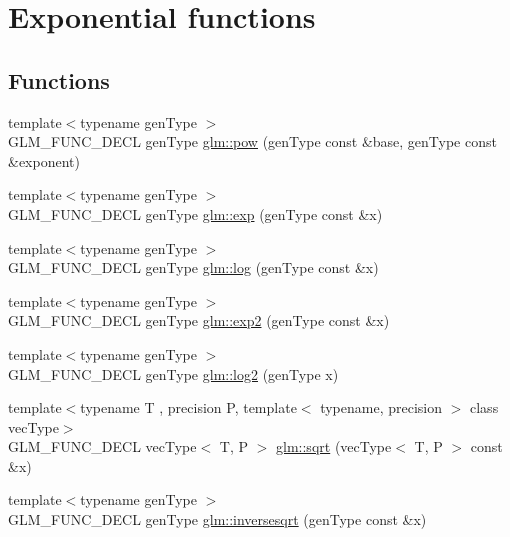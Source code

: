 \hypertarget{group__core__func__exponential}{}\section{Exponential functions}
\label{group__core__func__exponential}
\subsection*{Functions}
\begin{DoxyCompactItemize}
\item 
{\footnotesize template$<$typename gen\+Type $>$ }\\G\+L\+M\+\_\+\+F\+U\+N\+C\+\_\+\+D\+E\+CL gen\+Type \hyperlink{group__core__func__exponential_ga1ce4b2fddd26d0d3a35a8d98f37f3ac0}{glm\+::pow} (gen\+Type const \&base, gen\+Type const \&exponent)
\item 
{\footnotesize template$<$typename gen\+Type $>$ }\\G\+L\+M\+\_\+\+F\+U\+N\+C\+\_\+\+D\+E\+CL gen\+Type \hyperlink{group__core__func__exponential_gae154699ba6bda068d4b87cf9b987381f}{glm\+::exp} (gen\+Type const \&x)
\item 
{\footnotesize template$<$typename gen\+Type $>$ }\\G\+L\+M\+\_\+\+F\+U\+N\+C\+\_\+\+D\+E\+CL gen\+Type \hyperlink{group__core__func__exponential_ga0c8da2d2921da250e8700ac4476916a1}{glm\+::log} (gen\+Type const \&x)
\item 
{\footnotesize template$<$typename gen\+Type $>$ }\\G\+L\+M\+\_\+\+F\+U\+N\+C\+\_\+\+D\+E\+CL gen\+Type \hyperlink{group__core__func__exponential_gac45997fb3ac907cad408d6da0a0f5f54}{glm\+::exp2} (gen\+Type const \&x)
\item 
{\footnotesize template$<$typename gen\+Type $>$ }\\G\+L\+M\+\_\+\+F\+U\+N\+C\+\_\+\+D\+E\+CL gen\+Type \hyperlink{group__core__func__exponential_gad41e336e9bc8190fe99d2cfd9261c19b}{glm\+::log2} (gen\+Type x)
\item 
{\footnotesize template$<$typename T , precision P, template$<$ typename, precision $>$ class vec\+Type$>$ }\\G\+L\+M\+\_\+\+F\+U\+N\+C\+\_\+\+D\+E\+CL vec\+Type$<$ T, P $>$ \hyperlink{group__core__func__exponential_ga2ea6c6738ad6e09ec3405a628047801b}{glm\+::sqrt} (vec\+Type$<$ T, P $>$ const \&x)
\item 
{\footnotesize template$<$typename gen\+Type $>$ }\\G\+L\+M\+\_\+\+F\+U\+N\+C\+\_\+\+D\+E\+CL gen\+Type \hyperlink{group__core__func__exponential_ga5ac08ead2e50ad0295b9ad85a3e449e9}{glm\+::inversesqrt} (gen\+Type const \&x)
\end{DoxyCompactItemize}


